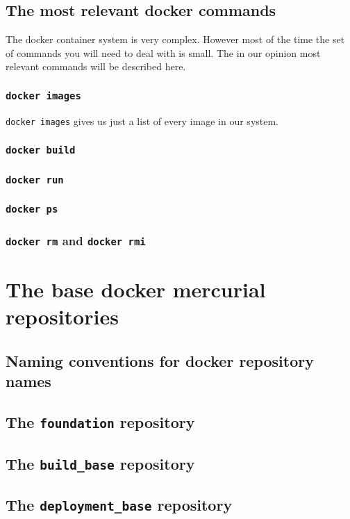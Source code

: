 		\subsection{The most relevant docker commands}
		The docker container system is very complex. However most of the time the set of commands you will need to deal with is small. The in our opinion most relevant commands will be described here.
			\subsubsection{\texttt{docker images}}
			\texttt{docker images} gives us just a list of every image in our system.
			\subsubsection{\texttt{docker build}}
			
			\subsubsection{\texttt{docker run}}
			\subsubsection{\texttt{docker ps}}
			\subsubsection{\texttt{docker rm} and \texttt{docker rmi}}
	\section{The base docker mercurial repositories}
		\subsection{Naming conventions for docker repository names}
		\subsection{The \texttt{foundation} repository}
		\subsection{The \texttt{build\_base} repository}
		\subsection{The \texttt{deployment\_base} repository}
